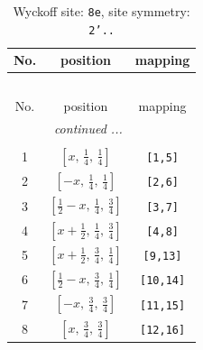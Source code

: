 \documentclass[fleqn,8pt]{jsarticle}
\begin{document}
\begin{longtable}{ccc}
\caption{Wyckoff site: {\tt 8e}, site symmetry: {\tt 2'..}}
 \\
 \hline \hline
No. & position & mapping \\ \hline \endfirsthead

\multicolumn{2}{l}{\tablename\ \thetable{}} \\
 \hline \hline
No. & position & mapping \\ \hline \endhead

 \hline \hline
\multicolumn{2}{r}{\footnotesize\it continued ...} \\ \endfoot

 \hline \hline
\multicolumn{2}{r}{} \\ \endlastfoot

1 & $\left[ x,\, \frac{1}{4},\, \frac{1}{4} \right]$ & {\tt [1,5]} \\ \hline
2 & $\left[ - x,\, \frac{1}{4},\, \frac{1}{4} \right]$ & {\tt [2,6]} \\ \hline
3 & $\left[ \frac{1}{2} - x,\, \frac{1}{4},\, \frac{3}{4} \right]$ & {\tt [3,7]} \\ \hline
4 & $\left[ x + \frac{1}{2},\, \frac{1}{4},\, \frac{3}{4} \right]$ & {\tt [4,8]} \\ \hline
5 & $\left[ x + \frac{1}{2},\, \frac{3}{4},\, \frac{1}{4} \right]$ & {\tt [9,13]} \\ \hline
6 & $\left[ \frac{1}{2} - x,\, \frac{3}{4},\, \frac{1}{4} \right]$ & {\tt [10,14]} \\ \hline
7 & $\left[ - x,\, \frac{3}{4},\, \frac{3}{4} \right]$ & {\tt [11,15]} \\ \hline
8 & $\left[ x,\, \frac{3}{4},\, \frac{3}{4} \right]$ & {\tt [12,16]} \\
\end{longtable}
\renewcommand{\arraystretch}{1.2}
\end{document}
